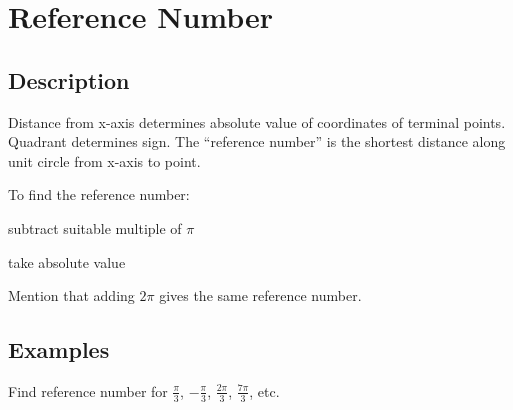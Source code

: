 \documentclass{exam}
\begin{document}
  \section{Reference Number}
  \subsection{Description}
  Distance from x-axis determines absolute value of coordinates of terminal points.  Quadrant determines sign.  The
  ``reference number'' is the shortest distance along unit circle from x-axis to point.

  To find the reference number:
  \begin{itemize*}
    \item subtract suitable multiple of $\pi$
    \item take absolute value
  \end{itemize*}

  Mention that adding $2 \pi$ gives the same reference number.
  \subsection{Examples}
  Find reference number for $\frac{\pi}{3}$, $- \frac{\pi}{3}$, $\frac{2 \pi}{3}$, $\frac{7 \pi}{3}$, etc.
\end{document}
